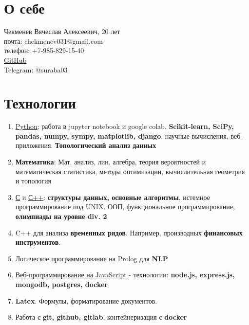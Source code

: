 \documentclass[a4paper,12pt]{article}
\date{}
\begin{document}
\section{О себе}
      \large Чекменев Вячеслав Алексеевич, 20 лет\\
      \large почта: chekmenev031@gmail.com \\
      \large телефон: +7-985-829-15-40 \\
      \large \href{https://github.com/Suraba03}{GitHub} \\
      \large Telegram: @suraba03\\
\section{Технологии}
\begin{enumerate}
    \item \underline{Python}: работа в jupyter notebook и google colab. \textbf{Scikit-learn, SciPy, pandas, numpy, sympy, matplotlib, django}, научные вычисления, веб-приложения. \textbf{Топологический анализ данных}
    \item \textbf{Математика}: Мат. анализ, лин. алгебра, теория вероятностей и математическая статистика, методы оптимизации, вычислительная геометрия и топология
    \item \underline{С} и \underline{С++}: \textbf{структуры данных, основные алгоритмы}, истемное программирование под UNIX. ООП, функциональное программирование, \textbf{олимпиады на уровне div. 2} 
    \item C++ для анализа \textbf{временных рядов}. Например, производных \textbf{финансовых инструментов}.
    \item Логическое программирование на \underline{Prolog} для \textbf{NLP}
    \item \underline{Веб-программирование на JavaScript} - технологии: \textbf{node.js, express.js, mongodb, postgres, docker}
    \item \textbf{Latex}. Формулы, форматирование документов.
    \item Работа с \textbf{git, github, gitlab}, контейнеризация с \textbf{docker}

\end{enumerate}
\end{document}
